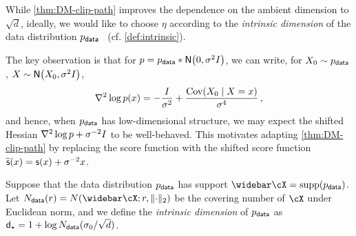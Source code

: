 \newcommand{\tscf}{\wt{\scf}}
\newcommand{\tscfs}{\wt{\scf}^\star}

While \cref{thm:DM-clip-path} improves the dependence on the ambient dimension to $\sqrt d$, ideally, we would like to choose $\eta$ according to the \emph{intrinsic dimension} of the data distribution $p_{\mathsf{data}}$~\citep{li2024adapting} (cf. \cref{def:intrinsic}).

The key observation is that for $p=\pdata*\Nsigma$, we can write, for $X_0 \sim p_{\mathsf{data}}$, $X \sim \normal{X_0,\sigma^2 I}$,
\begin{align}
    \nabla^2 \log p(x)=-\frac{I}{\sigma^2}+
    \frac{\mathrm{Cov}(X_0\mid X=x)}{\sigma^4}\,,
\end{align}
and hence, when $p_{\mathsf{data}}$ has low-dimensional structure, we may expect the shifted Hessian $\nabla^2 \log p+\sigma^{-2}I$ to be well-behaved. This motivates adapting \cref{thm:DM-clip-path} by replacing the score function with the shifted score function $\tscf(x)=\scf(x)+\sigma^{-2} x$. 

\begin{definition}\label{def:intrinsic}
Suppose that the data distribution $p_{\mathsf{data}}$ has support $\cXbar=\supp(\pdata)$. Let $\Ndata(r)=N(\cXbar; r, \nrm{\cdot}_2)$ be the covering number of $\cX$ under Euclidean norm, and we define the \emph{intrinsic dimension} of $p_{\mathsf{data}}$ as $\mathsf{d}_\star=1+\log N_{\mathsf{data}}(\sigma_0/\sqrt{d})$. 
\end{definition}

